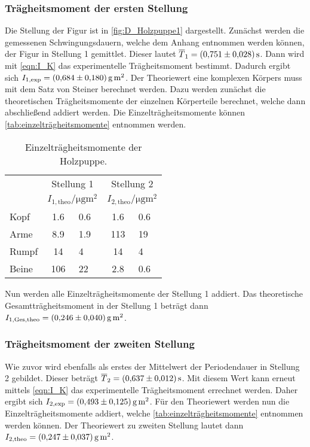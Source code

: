 \subsubsection{Trägheitsmoment der ersten Stellung}
\label{subsubsec:A_ballet}
Die Stellung der Figur ist in \autoref{fig:D_Holzpuppe1} dargestellt. Zunächst werden die gemessenen Schwingungsdauern, welche dem Anhang entnommen werden können, der Figur in Stellung 1 gemittlet.
Dieser lautet $\overline{T}_1 = \qty{0.751+-0.028}{\second}$. 
Dann wird mit \autoref{eqn:I_K} das experimentelle Trägheitsmoment bestimmt. Dadurch ergibt sich $I_{1,\text{exp}} = \qty{0.684+-0.180}{\gram\metre\squared}$. Der Theoriewert eine komplexen
Körpers muss mit dem Satz von Steiner berechnet werden. Dazu werden zunächst die theoretischen Trägheitsmomente der einzelnen Körperteile berechnet, welche dann abschließend addiert werden.
Die Einzelträgheitsmomente können \autoref{tab:einzelträgheitsmomente} entnommen werden.
\begin{table}
  \centering
  \caption{Einzelträgheitsmomente der Holzpuppe.} 
  \label{tab:einzelträgheitsmomente}
  \begin{tabular}{l c @{${}\pm{}$} l c @{${}\pm{}$} l}
      \toprule
      & \multicolumn{2}{c}{Stellung 1} & \multicolumn{2}{c}{Stellung 2} \\
      \cmidrule(lr){2-3}\cmidrule(lr){4-5}
       & \multicolumn{2}{c}{$\unit{I_{1,\text{theo}}\per\micro\gram\metre\squared}$} & \multicolumn{2}{c}{$\unit{I_{2,\text{theo}}\per\micro\gram\metre\squared}$} \\
      \midrule
      {Kopf} & 1.6 & 0.6 & 1.6 & 0.6 \\
      {Arme} & 8.9 & 1.9 & 113 & 19 \\
      {Rumpf} & 14 & 4 & 14 & 4 \\
      {Beine} & 106 & 22 & 2.8 & 0.6 \\
      \bottomrule 
  \end{tabular}
\end{table}
Nun werden alle Einzelträgheitsmomente der Stellung 1 addiert. Das theoretische Gesamtträgheitsmoment in der Stellung 1 beträgt dann $I_{1,\text{Ges},\text{theo}} = \qty{0.246+-0.040}{\gram\metre\squared}$.
\subsubsection{Trägheitsmoment der zweiten Stellung}
\label{subsubsec:A_tpose}
Wie zuvor wird ebenfalls als erstes der Mittelwert der Periodendauer in Stellung 2 gebildet. Dieser beträgt $\overline{T}_2 = \qty{0.637+-0.012}{\second}$. Mit diesem Wert kann erneut mittels \autoref{eqn:I_K}
das experimentelle Trägheitsmoment errechnet werden. Daher ergibt sich $I_{2,\text{exp}} = \qty{0.493+-0.125}{\gram\metre\squared}$. Für den Theoriewert werden nun die Einzelträgheitsmomente addiert, 
welche \autoref{tab:einzelträgheitsmomente} entnommen werden können. Der Theoriewert zu zweiten Stellung lautet dann $I_{2,\text{theo}} = \qty{0.247+-0.037}{\gram\metre\squared}$.
